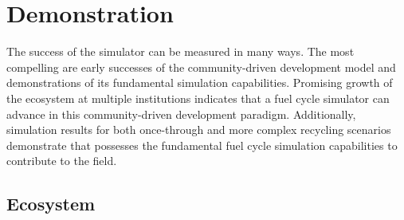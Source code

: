 \section{Demonstration}
%

%



The success of the \Cyclus simulator can be measured in many ways.  The most
compelling are early successes of the community-driven development model and 
demonstrations of its fundamental simulation capabilities. Promising
growth of the \Cyclus ecosystem at multiple institutions indicates that a fuel
cycle simulator can advance in this community-driven development
paradigm. Additionally, simulation results for both once-through and more
complex recycling scenarios demonstrate that \Cyclus possesses the fundamental
fuel cycle simulation capabilities to contribute to the field.

\subsection{Ecosystem}


